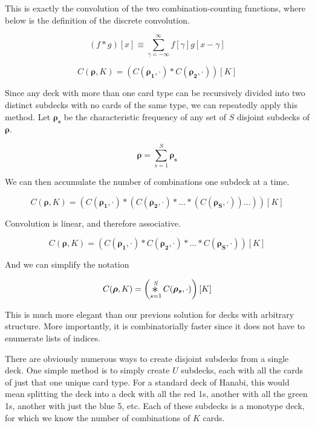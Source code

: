 \documentclass{article}
\newcommand{\Conv}{\mathop{\scalebox{1.5}{\raisebox{-0.2ex}{$\ast$}}}}%
\begin{document}
This is exactly the convolution of the two combination-counting functions, where below is the definition of the discrete convolution.

\begin{equation}
     (f * g)[x] \equiv \sum_{\gamma=-\infty}^{\infty} f[\gamma]g[x - \gamma]
\end{equation}

\begin{equation}
    C(\bm{\rho}, K) = (C(\bm{\rho_1}, \cdot) * C(\bm{\rho_2}, \cdot))[K]
\end{equation}

Since any deck with more than one card type can be recursively divided into two distinct subdecks with no cards of the same type, we can repeatedly apply this method. Let $\bm{\rho_{s}}$ be the characteristic frequency of any set of $S$ disjoint subdecks of $\bm{\rho}$.

\begin{equation}
    \bm{\rho} = \sum_{s = 1}^{S} \bm{\rho_{s}}
\end{equation}

We can then accumulate the number of combinations one subdeck at a time.

\begin{equation}
    C(\bm{\rho}, K) = (C(\bm{\rho_{1}}, \cdot) * (C(\bm{\rho_{2}},\cdot) * ... * (C(\bm{\rho_{S}}, \cdot))...))[K]
\end{equation}

Convolution is linear, and therefore associative.

\begin{equation}
    C(\bm{\rho}, K) = (C(\bm{\rho_{1}}, \cdot) * C(\bm{\rho_{2}},\cdot) * ... * C(\bm{\rho_{S}}, \cdot)) [K]
\end{equation}

And we can simplify the notation

\begin{equation}
    C(\bm{\rho}, K) =  \left (\Conv_{s = 1}^S C(\bm{\rho_{s}}, \cdot)\right )[K]
\end{equation}

This is much more elegant than our previous solution for decks with arbitrary structure. More importantly, it is combinatorially faster since it does not have to enumerate lists of indices.

There are obviously numerous ways to create disjoint subdecks from a single deck. One simple method is to simply create $U$ subdecks, each with all the cards of just that one unique card type. For a standard deck of Hanabi, this would mean splitting the deck into a deck with all the red 1s, another with all the green 1s, another with just the blue 5, etc. Each of these subdecks is a monotype deck, for which we know the number of combinations of $K$ cards.
\end{document}
